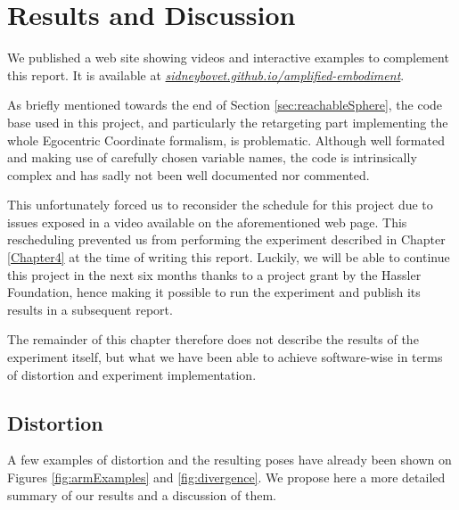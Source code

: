 
\chapter{Results and Discussion}
\label{Chapter5}

We published a web site showing videos and interactive examples to complement this report. It is available at \href{https://sidneybovet.github.io/amplified-embodiment/}{\textit{sidneybovet.github.io/amplified-embodiment}}.

As briefly mentioned towards the end of Section \ref{sec:reachableSphere}, the code base used in this project, and particularly the retargeting part implementing the whole Egocentric Coordinate formalism, is problematic. Although well formated and making use of carefully chosen variable names, the code is intrinsically complex and has sadly not been well documented nor commented.

This unfortunately forced us to reconsider the schedule for this project due to issues exposed in a video available on the aforementioned web page. This rescheduling prevented us from performing the experiment described in Chapter \ref{Chapter4} at the time of writing this report. Luckily, we will be able to continue this project in the next six months thanks to a project grant by the Hassler Foundation, hence making it possible to run the experiment and publish its results in a subsequent report.

The remainder of this chapter therefore does not describe the results of the experiment itself, but what we have been able to achieve software-wise in terms of distortion and experiment implementation.

\section{Distortion}

A few examples of distortion and the resulting poses have already been shown on Figures \ref{fig:armExamples} and \ref{fig:divergence}. We propose here a more detailed summary of our results and a discussion of them.


